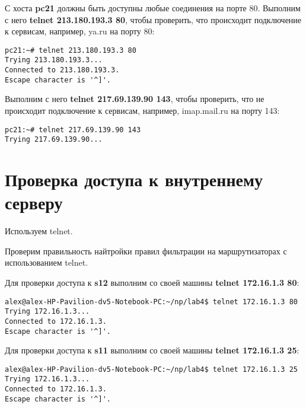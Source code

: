\documentclass[a4paper,12pt]{article}
\begin{document}
С хоста \textbf{pc21} должны быть доступны любые соединения на порте 80.
Выполним с него \textbf{telnet 213.180.193.3 80},  чтобы проверить, что
происходит подключение к сервисам, например, ya.ru на порту 80:
\begin{Verbatim}
pc21:~# telnet 213.180.193.3 80
Trying 213.180.193.3...
Connected to 213.180.193.3.
Escape character is '^]'.
\end{Verbatim}

Выполним с него \textbf{telnet 217.69.139.90 143},  чтобы проверить, что не
происходит подключение к сервисам, например, imap.mail.ru на порту 143:
\begin{Verbatim}
pc21:~# telnet 217.69.139.90 143
Trying 217.69.139.90...
\end{Verbatim}


\section{Проверка доступа к внутреннему серверу}

Используем telnet.

Проверим правильность найтройки правил фильтрации на маршрутизаторах
с использованием  telnet.

Для проверки доступа к \textbf{s12} выполним со своей машины
\textbf{telnet 172.16.1.3 80}:
\begin{Verbatim}
alex@alex-HP-Pavilion-dv5-Notebook-PC:~/np/lab4$ telnet 172.16.1.3 80
Trying 172.16.1.3...
Connected to 172.16.1.3.
Escape character is '^]'.
\end{Verbatim}

Для проверки доступа к \textbf{s11} выполним со своей машины
\textbf{telnet 172.16.1.3 25}:
\begin{Verbatim}
alex@alex-HP-Pavilion-dv5-Notebook-PC:~/np/lab4$ telnet 172.16.1.3 25
Trying 172.16.1.3...
Connected to 172.16.1.3.
Escape character is '^]'.
\end{Verbatim}
\end{document}
